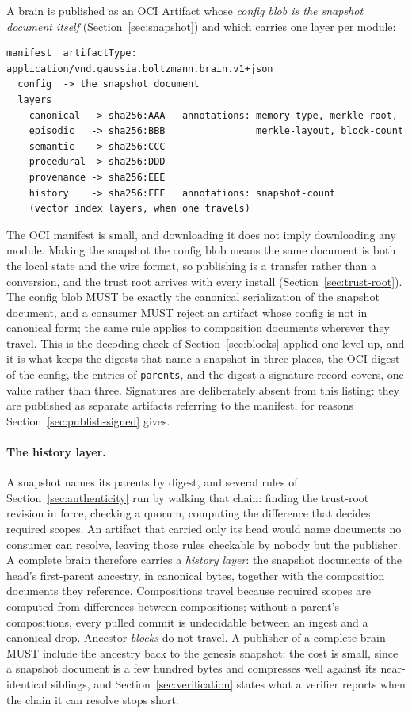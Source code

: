 \documentclass[11pt,a4paper]{article}
\begin{document}
A brain is published as an OCI Artifact whose \emph{config blob is the snapshot
document itself} (Section~\ref{sec:snapshot}) and which carries one layer per
module:
\begin{verbatim}
manifest  artifactType: application/vnd.gaussia.boltzmann.brain.v1+json
  config  -> the snapshot document
  layers
    canonical  -> sha256:AAA   annotations: memory-type, merkle-root,
    episodic   -> sha256:BBB                merkle-layout, block-count
    semantic   -> sha256:CCC
    procedural -> sha256:DDD
    provenance -> sha256:EEE
    history    -> sha256:FFF   annotations: snapshot-count
    (vector index layers, when one travels)
\end{verbatim}
The OCI manifest is small, and downloading it does not imply downloading any
module. Making the snapshot the config blob means the same document is both the local
state and the wire format, so publishing is a transfer rather than a
conversion, and the trust root arrives with every install
(Section~\ref{sec:trust-root}). The config blob MUST be exactly the canonical
serialization of the snapshot document, and a consumer MUST reject an artifact
whose config is not in canonical form; the same rule applies to composition
documents wherever they travel. This is the decoding check of
Section~\ref{sec:blocks} applied one level up, and it is what keeps the
digests that name a snapshot in three places, the OCI digest of the config,
the entries of \texttt{parents}, and the digest a signature record covers, one
value rather than three.
Signatures are deliberately absent from this listing: they are published as
separate artifacts referring to the manifest, for reasons
Section~\ref{sec:publish-signed} gives.

\paragraph{The history layer.}
A snapshot names its parents by digest, and several rules of
Section~\ref{sec:authenticity} run by walking that chain: finding the
trust-root revision in force, checking a quorum, computing the difference that
decides required scopes. An artifact that carried only its head would name
documents no consumer can resolve, leaving those rules checkable by nobody but
the publisher. A complete brain therefore carries a \emph{history layer}: the
snapshot documents of the head's first-parent ancestry, in canonical bytes,
together with the composition documents they reference. Compositions travel
because required scopes are computed from differences between compositions;
without a parent's compositions, every pulled commit is undecidable between an
ingest and a canonical drop. Ancestor \emph{blocks} do not travel. A publisher
of a complete brain MUST include the ancestry back to the genesis snapshot;
the cost is small, since a snapshot document is a few hundred bytes and
compresses well against its near-identical siblings, and
Section~\ref{sec:verification} states what a verifier reports when the chain
it can resolve stops short.
\end{document}
